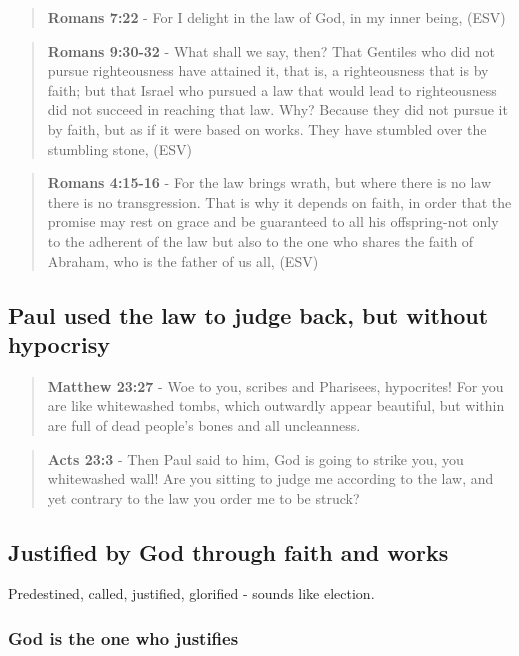 \documentclass[11pt]{article}
\begin{document}
\begin{quote}
\textbf{Romans 7:22} - For I delight in the law of God, in my inner being, (ESV)
\end{quote}

\begin{quote}
\textbf{Romans 9:30-32} - What shall we say, then? That Gentiles who did not pursue righteousness have attained it, that is, a righteousness that is by faith; but that Israel who pursued a law that would lead to righteousness did not succeed in reaching that law. Why? Because they did not pursue it by faith, but as if it were based on works. They have stumbled over the stumbling stone, (ESV)
\end{quote}

\begin{quote}
\textbf{Romans 4:15-16} - For the law brings wrath, but where there is no law there is no transgression. That is why it depends on faith, in order that the promise may rest on grace and be guaranteed to all his offspring-not only to the adherent of the law but also to the one who shares the faith of Abraham, who is the father of us all, (ESV)
\end{quote}

\subsection{Paul used the law to judge back, but without hypocrisy}
\label{sec:orgc160f07}
\begin{quote}
\textbf{Matthew 23:27} - Woe to you, scribes and Pharisees, hypocrites! For you are like whitewashed tombs, which outwardly appear beautiful, but within are full of dead people's bones and all uncleanness.
\end{quote}

\begin{quote}
\textbf{Acts 23:3} - Then Paul said to him, God is going to strike you, you whitewashed wall! Are you sitting to judge me according to the law, and yet contrary to the law you order me to be struck?
\end{quote}

\subsection{Justified by God through faith and works}
\label{sec:org4f10d3c}
Predestined, called, justified, glorified - sounds like election.

\subsubsection{God is the one who justifies}
\label{sec:orgbbdab50}
\end{document}
